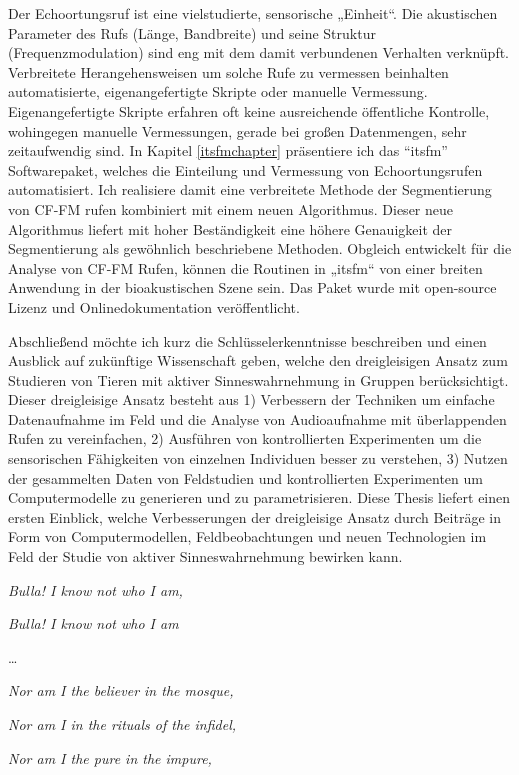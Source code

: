\documentclass[
]{book}
\begin{document}
Der Echoortungsruf ist eine vielstudierte, sensorische „Einheit``. Die akustischen Parameter des Rufs (Länge, Bandbreite) und seine Struktur (Frequenzmodulation) sind eng mit dem damit verbundenen Verhalten verknüpft. Verbreitete Herangehensweisen um solche Rufe zu vermessen beinhalten automatisierte, eigenangefertigte Skripte oder manuelle Vermessung. Eigenangefertigte Skripte erfahren oft keine ausreichende öffentliche Kontrolle, wohingegen manuelle Vermessungen, gerade bei großen Datenmengen, sehr zeitaufwendig sind. In Kapitel \ref{itsfmchapter} präsentiere ich das ``itsfm'' Softwarepaket, welches die Einteilung und Vermessung von Echoortungsrufen automatisiert. Ich realisiere damit eine verbreitete Methode der Segmentierung von CF-FM rufen kombiniert mit einem neuen Algorithmus. Dieser neue Algorithmus liefert mit hoher Beständigkeit eine höhere Genauigkeit der Segmentierung als gewöhnlich beschriebene Methoden. Obgleich entwickelt für die Analyse von CF-FM Rufen, können die Routinen in „itsfm`` von einer breiten Anwendung in der bioakustischen Szene sein. Das Paket wurde mit open-source Lizenz und Onlinedokumentation veröffentlicht.

Abschließend möchte ich kurz die Schlüsselerkenntnisse beschreiben und einen Ausblick auf zukünftige Wissenschaft geben, welche den dreigleisigen Ansatz zum Studieren von Tieren mit aktiver Sinneswahrnehmung in Gruppen berücksichtigt. Dieser dreigleisige Ansatz besteht aus 1) Verbessern der Techniken um einfache Datenaufnahme im Feld und die Analyse von Audioaufnahme mit überlappenden Rufen zu vereinfachen, 2) Ausführen von kontrollierten Experimenten um die sensorischen Fähigkeiten von einzelnen Individuen besser zu verstehen, 3) Nutzen der gesammelten Daten von Feldstudien und kontrollierten Experimenten um Computermodelle zu generieren und zu parametrisieren. Diese Thesis liefert einen ersten Einblick, welche Verbesserungen der dreigleisige Ansatz durch Beiträge in Form von Computermodellen, Feldbeobachtungen und neuen Technologien im Feld der Studie von aktiver Sinneswahrnehmung bewirken kann.

\newpage

\emph{Bulla! I know not who I am,}

\emph{Bulla! I know not who I am}

\ldots{}

\emph{Nor am I the believer in the mosque,}

\emph{Nor am I in the rituals of the infidel,}

\emph{Nor am I the pure in the impure,}
\end{document}
